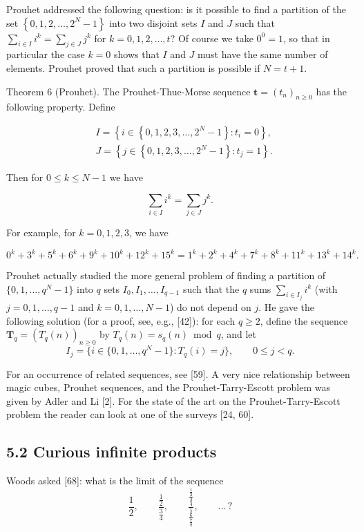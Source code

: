 \documentclass[10pt]{article}
\begin{document}
Prouhet addressed the following question: is it possible to find a partition of the set $\left\{0,1,2, \ldots, 2^{N}-1\right\}$ into two disjoint sets $I$ and $J$ such that $\sum_{i \in I} i^{k}=\sum_{j \in J} j^{k}$ for $k=0,1,2, \ldots,t$? Of course we take $0^{0}=1$, so that in particular the case $k=0$ shows that $I$ and $J$ must have the same number of elements. Prouhet proved that such a partition is possible if $N=t+1$.

Theorem 6 (Prouhet). The Prouhet-Thue-Morse sequence $\mathbf{t}=\left(t_{n}\right)_{n \geq 0}$ has the following property. Define

\[
\begin{aligned}
& I=\left\{i \in\left\{0,1,2,3, \ldots, 2^{N}-1\right\}: t_{i}=0\right\}, \\
& J=\left\{j \in\left\{0,1,2,3, \ldots, 2^{N}-1\right\}: t_{j}=1\right\}.
\end{aligned}
\]

Then for $0 \leq k \leq N-1$ we have

\[
\sum_{i \in I} i^{k}=\sum_{j \in J} j^{k}.
\]

For example, for $k=0,1,2,3$, we have

\[
0^{k}+3^{k}+5^{k}+6^{k}+9^{k}+10^{k}+12^{k}+15^{k}=1^{k}+2^{k}+4^{k}+7^{k}+8^{k}+11^{k}+13^{k}+14^{k}.
\]

Prouhet actually studied the more general problem of finding a partition of $\{0,1,\ldots,q^{N}-1\}$ into $q$ sets $I_{0},I_{1},\ldots,I_{q-1}$ such that the $q$ sums $\sum_{i\in I_j} i^k$ (with $j=0,1,\ldots,q-1$ and $k=0,1,\ldots,N-1$) do not depend on $j$. He gave the following solution (for a proof, see, e.g., [42]): for each $q\geq 2$, define the sequence $\mathbf{T}_q=(T_q(n))_{n\geq 0}$ by $T_q(n)=s_q(n)\bmod q$, and let
\[
I_j=\{i\in\{0,1,\ldots,q^N-1\}:T_q(i)=j\},\qquad 0\leq j<q.
\]

For an occurrence of related sequences, see [59]. A very nice relationship between magic cubes, Prouhet sequences, and the Prouhet-Tarry-Escott problem was given by Adler and Li [2]. For the state of the art on the Prouhet-Tarry-Escott problem the reader can look at one of the surveys [24, 60].

\subsection*{5.2 Curious infinite products}
Woods asked [68]: what is the limit of the sequence
\[
\frac12,\qquad
\frac{\frac12}{\frac34},\qquad
\frac{\frac{\frac12}{\frac34}}{\frac{\frac56}{\frac78}},\qquad\ldots\,?
\]
\end{document}
